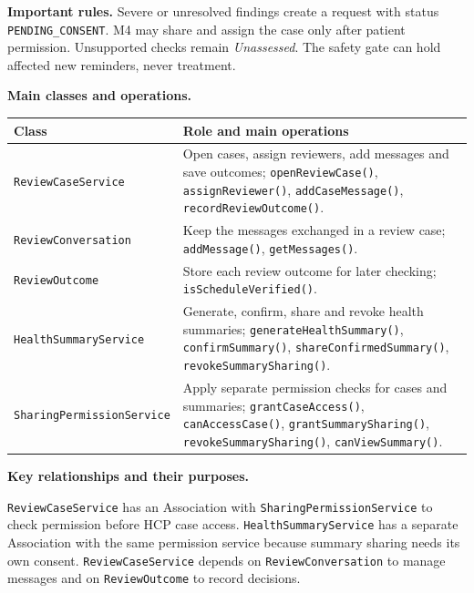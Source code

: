 \noindent\textbf{Important rules.} Severe or unresolved findings create a request
with status \texttt{PENDING\_CONSENT}. M4 may share and assign the case only
after patient permission. Unsupported checks remain \emph{Unassessed}.
The safety gate can hold affected new reminders, never treatment.



\noindent\textbf{Main classes and operations.}\par\smallskip
\begingroup\small
\noindent\begin{tabularx}{\textwidth}{|L{0.37\textwidth}|Y|}
\hline
\textbf{Class} & \textbf{Role and main operations} \\ \hline
\texttt{ReviewCaseService} & Open cases, assign reviewers, add messages and save outcomes; \texttt{openReviewCase()}, \texttt{assignReviewer()}, \texttt{addCaseMessage()}, \texttt{recordReviewOutcome()}. \\ \hline
\texttt{ReviewConversation} & Keep the messages exchanged in a review case; \texttt{addMessage()}, \texttt{getMessages()}. \\ \hline
\texttt{ReviewOutcome} & Store each review outcome for later checking; \texttt{isScheduleVerified()}. \\ \hline
\texttt{HealthSummaryService} & Generate, confirm, share and revoke health summaries; \texttt{generateHealthSummary()}, \texttt{confirmSummary()}, \texttt{shareConfirmedSummary()}, \texttt{revokeSummarySharing()}. \\ \hline
\texttt{SharingPermissionService} & Apply separate permission checks for cases and summaries; \texttt{grantCaseAccess()}, \texttt{canAccessCase()}, \texttt{grantSummarySharing()}, \texttt{revokeSummarySharing()}, \texttt{canViewSummary()}. \\ \hline
\end{tabularx}\par
\endgroup

\noindent\textbf{Key relationships and their purposes.}\par\smallskip
\texttt{ReviewCaseService} has an Association with
\texttt{SharingPermissionService} to check permission before HCP case
access. \texttt{HealthSummaryService} has a separate Association with
the same permission service because summary sharing needs its own consent.
\texttt{ReviewCaseService} depends on \texttt{ReviewConversation} to
manage messages and on \texttt{ReviewOutcome} to record decisions.

